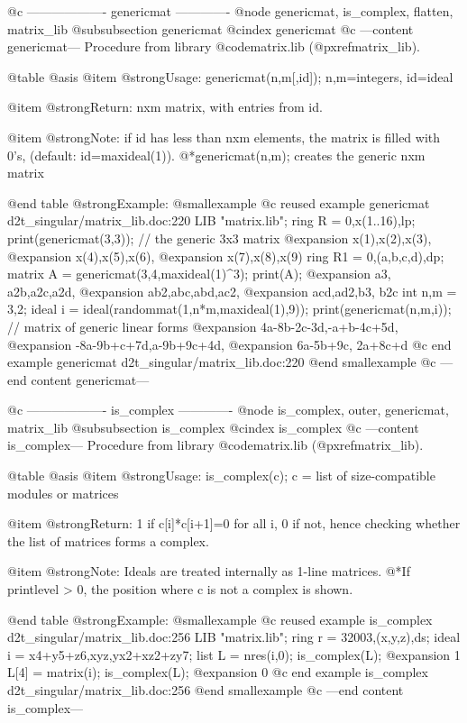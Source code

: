 @c ------------------- genericmat -------------
@node genericmat, is_complex, flatten, matrix_lib
@subsubsection genericmat
@cindex genericmat
@c ---content genericmat---
Procedure from library @code{matrix.lib} (@pxref{matrix_lib}).

@table @asis
@item @strong{Usage:}
genericmat(n,m[,id]); n,m=integers, id=ideal

@item @strong{Return:}
nxm matrix, with entries from id.

@item @strong{Note:}
if id has less than nxm elements, the matrix is filled with 0's,
(default: id=maxideal(1)).
@*genericmat(n,m); creates the generic nxm matrix

@end table
@strong{Example:}
@smallexample
@c reused example genericmat d2t_singular/matrix_lib.doc:220 
LIB "matrix.lib";
ring R = 0,x(1..16),lp;
print(genericmat(3,3));      // the generic 3x3 matrix
@expansion{} x(1),x(2),x(3),
@expansion{} x(4),x(5),x(6),
@expansion{} x(7),x(8),x(9) 
ring R1 = 0,(a,b,c,d),dp;
matrix A = genericmat(3,4,maxideal(1)^3);
print(A);
@expansion{} a3, a2b,a2c,a2d,
@expansion{} ab2,abc,abd,ac2,
@expansion{} acd,ad2,b3, b2c 
int n,m = 3,2;
ideal i = ideal(randommat(1,n*m,maxideal(1),9));
print(genericmat(n,m,i));    // matrix of generic linear forms
@expansion{} 4a-8b-2c-3d,-a+b-4c+5d,
@expansion{} -8a-9b+c+7d,a-9b+9c+4d,
@expansion{} 6a-5b+9c,   2a+8c+d    
@c end example genericmat d2t_singular/matrix_lib.doc:220
@end smallexample
@c ---end content genericmat---

@c ------------------- is_complex -------------
@node is_complex, outer, genericmat, matrix_lib
@subsubsection is_complex
@cindex is_complex
@c ---content is_complex---
Procedure from library @code{matrix.lib} (@pxref{matrix_lib}).

@table @asis
@item @strong{Usage:}
is_complex(c); c = list of size-compatible modules or matrices

@item @strong{Return:}
1 if c[i]*c[i+1]=0 for all i, 0 if not, hence checking whether the
list of matrices forms a complex.

@item @strong{Note:}
Ideals are treated internally as 1-line matrices.
@*If printlevel > 0, the position where c is not a complex is shown.

@end table
@strong{Example:}
@smallexample
@c reused example is_complex d2t_singular/matrix_lib.doc:256 
LIB "matrix.lib";
ring r  = 32003,(x,y,z),ds;
ideal i = x4+y5+z6,xyz,yx2+xz2+zy7;
list L  = nres(i,0);
is_complex(L);
@expansion{} 1
L[4]    = matrix(i);
is_complex(L);
@expansion{} 0
@c end example is_complex d2t_singular/matrix_lib.doc:256
@end smallexample
@c ---end content is_complex---


